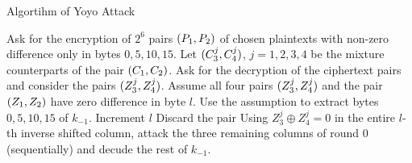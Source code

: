 \documentclass[notheorems]{beamer}
\theoremstyle{definition}
\theoremstyle{example}
\begin{document}
    \begin{frame}{Algortihm of Yoyo Attack}
        \begin{algorithm}[H]
            \caption{Yoyo Attack on Five Round AES}
            \label{alg:yoyo-aes}
            \algrenewcommand{}
            \scriptsize
            \begin{algorithmic}[1]
                \State Ask for the encryption of \(2^6\) pairs \((P_1,
                P_2)\) of chosen plaintexts with non-zero difference only in 
                bytes \(0, 5, 10, 15\).
                    \State Let \((C_3^j, C_4^j)\), \(j = 1, 2, 3, 4\) be
                    the mixture counterparts of the pair \((C_1, C_2)\).
                    \State Ask for the decryption of the ciphertext pairs and
                    consider the pairs \((Z_3^j, Z_4^j)\).
                        \State Assume all four pairs \((Z_3^j, Z_4^j)\) and
                        the pair \((Z_1, Z_2)\) have zero difference in 
                        byte \(l\).
                        \State Use the assumption to extract bytes \(0, 5, 10,
                        15\) of \(k_{-1}\).
                            \State Increment \(l\)
                                Discard the pair
                            \EndIf
                        \Else
                            \State Using \(Z_3^j \oplus Z_4^j = 0\) in the
                            entire \(l\)-th inverse shifted column, attack the
                            three remaining columns of round 0 (sequentially)
                            and decude the rest of \(k_{-1}\).
                        \EndIf
                    \EndFor
                \EndFor
            \end{algorithmic}
        \end{algorithm}
    \end{frame}
\end{document}
